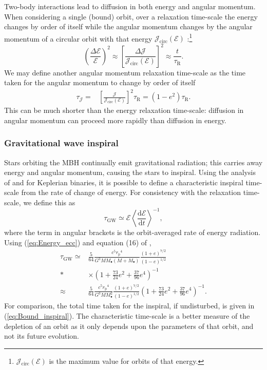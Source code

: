 \documentclass[useAMS,usedcolumn,usegraphicx,usenatbib]{mn2e}
\newcommand{\eqnref}[1]{(\ref{eq:#1})}
\newcommand{\sub}[1]{\ensuremath{_\mathrm{#1}}}
\newcommand{\dd}{\ensuremath{\mathrm{d}}}
\newcommand{\diff}[2]{\ensuremath{\frac{\dd {#1}}{\dd {#2}}}}
\begin{document}
Two-body interactions lead to diffusion in both energy and angular momentum. When considering a single (bound) orbit, over a relaxation time-scale the energy changes by order of itself while the angular momentum changes by the angular momentum of a circular orbit with that energy $\mathcal{J}\sub{circ}(\mathcal{E})$ \citep{Lightman1977, Rauch1996, Hopman2005, Madigan2011}:\footnote{$\mathcal{J}\sub{circ}(\mathcal{E})$ is the maximum value for orbits of that energy.}
\begin{equation}
\left(\frac{\Delta\mathcal{E}}{\mathcal{E}}\right)^{2} \approx \left[\frac{\Delta \mathcal{J}}{\mathcal{J}\sub{circ}(\mathcal{E})}\right]^{2} \approx \frac{t}{\tau\sub{R}}.
\label{eq:diffuse-relax}
\end{equation}
We may define another angular momentum relaxation time-scale as the time taken for the angular momentum to change by order of itself \citep{Merritt2011}
\begin{align}
\tau_\mathcal{J} = {} & \left[\frac{\mathcal{J}}{\mathcal{J}\sub{circ}(\mathcal{E})}\right]^2\tau\sub{R} = \left(1 - e^2\right) \tau\sub{R}.
\label{eq:J-time}
\end{align}
This can be much shorter than the energy relaxation time-scale: diffusion in angular momentum can proceed more rapidly than diffusion in energy.

\subsubsection{Gravitational wave inspiral}\label{sec:GW-in}

Stars orbiting the MBH continually emit gravitational radiation; this carries away energy and angular momentum, causing the stars to inspiral. Using the analysis of \citet{Peters1963} and \citet{Peters1964} for Keplerian binaries, it is possible to define a characteristic inspiral time-scale from the rate of change of energy. For consistency with the relaxation time-scale, we define this as \citep{MiraldaEscude2000, Merritt2011}
\begin{equation}
\tau\sub{GW} \simeq \mathcal{E}\left\langle\diff{\mathcal{E}}{t}\right\rangle^{-1},
\label{eq:tGW-def}
\end{equation}
where the term in angular brackets is the orbit-averaged rate of energy radiation. Using \eqnref{Energy_ecc} and equation (16) of \citet{Peters1963},
\begin{align}
\tau\sub{GW} \simeq {} & \frac{5}{64}\frac{c^5r\sub{p}^4}{G^3MM_\bullet\left(M + M_\bullet\right)}\frac{(1+e)^{7/2}}{(1-e)^{1/2}} \nonumber \\*
 {} & \times {} \left(1+\frac{73}{24}e^2 + \frac{37}{96}e^4\right)^{-1} \\
 \approx {} & \frac{5}{64}\frac{c^5r\sub{p}^4}{G^3MM_\bullet^2}\frac{(1+e)^{7/2}}{(1-e)^{1/2}}\left(1+\frac{73}{24}e^2 + \frac{37}{96}e^4\right)^{-1}.
\end{align}
For comparison, the total time taken for the inspiral, if undisturbed, is given in \eqnref{Bound_inspiral}. The characteristic time-scale is a better measure of the depletion of an orbit as it only depends upon the parameters of that orbit, and not its future evolution.
\end{document}
